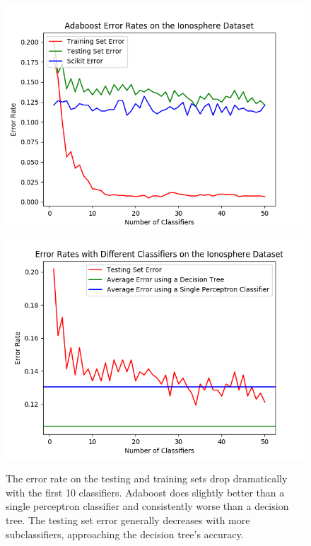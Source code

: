 \documentclass{article}
\begin{document}
\begin{figure}[hbt]
\centering
\includegraphics[scale=0.7]{Ionosphere_1}
\includegraphics[scale=0.7]{Ionosphere_different_classifiers_1} 
\caption{The error rate on the testing and training sets drop dramatically with the first 10 classifiers. Adaboost does slightly better than a single perceptron classifier and consistently worse than a decision tree. The testing set error generally decreases with more subclassifiers, approaching the decision tree's accuracy.}
\end{figure}
\end{document}
